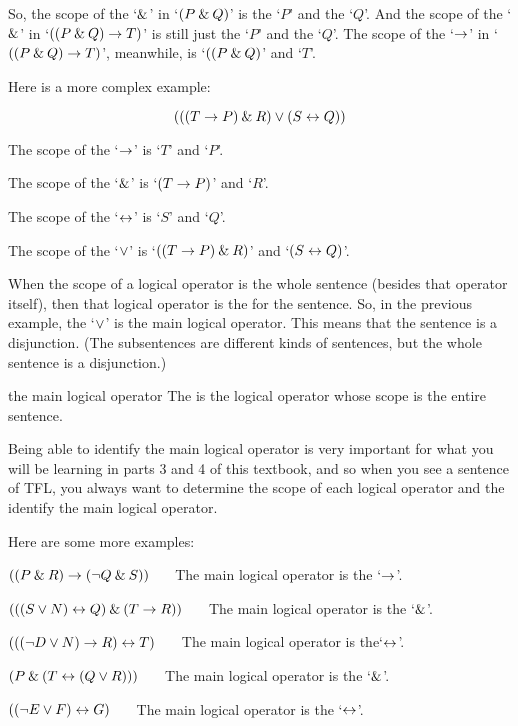 So, the scope of the `$\mathbin{\&}$' in `$(P \mathbin{\&} Q)$' is the `$P$' and the `$Q$'. And the scope of the `$\mathbin{\&}$' in `$((P \mathbin{\&} Q) \rightarrow T)$' is still just the `$P$' and the `$Q$'. The scope of the `$\rightarrow$' in `$((P \mathbin{\&} Q) \rightarrow T)$', meanwhile, is `$((P \mathbin{\&} Q)$' and `$T$'.

Here is a more complex example:

$$(((T \rightarrow P) \mathbin{\&} R) \vee (S \leftrightarrow Q))$$

\begin{ebullet}
	\item[] The scope of the `$\rightarrow$' is `$T$' and `$P$'. 
	\item[] The scope of the `$\mathbin{\&}$' is `$(T \rightarrow P)$' and `$R$'.
	\item[] The scope of the `$\leftrightarrow$' is `$S$' and `$Q$'.
	\item[] The scope of the `$\vee$' is `$((T \rightarrow P) \mathbin{\&} R)$' and `$(S \leftrightarrow Q)$'.
\end{ebullet}

When the scope of a logical operator is the whole sentence (besides that operator itself), then that logical operator is the  for the sentence. So, in the previous example, the `$\vee$' is the main logical operator. This means that the sentence is a disjunction. (The subsentences are different kinds of sentences, but the whole sentence is a disjunction.)

\begin{factboxy}{the main logical operator}
The  is the logical operator whose scope is the entire sentence. 
\end{factboxy}

Being able to identify the main logical operator is very important for what you will be learning in parts 3 and 4 of this textbook, and so when you see a sentence of TFL, you always want to determine the scope of each logical operator and the identify the main logical operator. 

Here are some more examples:
\begin{earg}
\item[\ex{logic-operator1}] $((P \mathbin{\&} R) \rightarrow ({\neg} Q \mathbin{\&} S))$ ~~~The main logical operator is the `$\rightarrow$'. 
\item[\ex{logic-operator2}] $(((S \vee N) \leftrightarrow Q) \mathbin{\&} (T \rightarrow R))$ ~~~The main logical operator is the `$\mathbin{\&}$'.
\item[\ex{logic-operator3}] $((({\neg} D \vee N) \rightarrow R) \leftrightarrow T)$ ~~~The main logical operator is the`$\leftrightarrow$'.
\item[\ex{logic-operator4}] $(P \mathbin{\&} (T \leftrightarrow (Q \vee R)))$ ~~~The main logical operator is the `$\mathbin{\&}$'. 
\item[\ex{logic-operator5}] $(({\neg} E \vee F) \leftrightarrow G)$ ~~~The main logical operator is the `$\leftrightarrow$'.
\end{earg}



